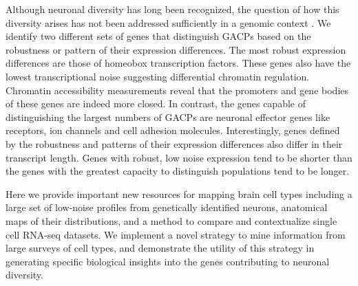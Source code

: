 Although neuronal diversity has long been recognized, the question of how this diversity arises has not been addressed sufficiently in a genomic context \citep{Arendt_2016, Muotri_2006}. We identify two different sets of genes that distinguish GACPs based on the robustness or pattern of their expression differences. The most robust expression differences are those of homeobox transcription factors. These genes also have the lowest transcriptional noise suggesting differential chromatin regulation. Chromatin accessibility measurements reveal that the promoters and gene bodies of these genes are indeed more closed. In contrast, the genes capable of distinguishing the largest numbers of GACPs are neuronal effector genes like receptors, ion channels and cell adhesion molecules. Interestingly, genes defined by the robustness and patterns of their expression differences also differ in their transcript length. Genes with robust, low noise expression tend to be shorter than the genes with the greatest capacity to distinguish populations tend to be longer.

Here we provide important new resources for mapping brain cell types including a large set of low-noise profiles from genetically identified neurons, anatomical maps of their distributions, and a method to compare and contextualize single cell RNA-seq datasets. We implement a novel strategy to mine information from large surveys of cell types, and demonstrate the utility of this strategy in generating specific biological insights into the genes contributing to neuronal diversity.


